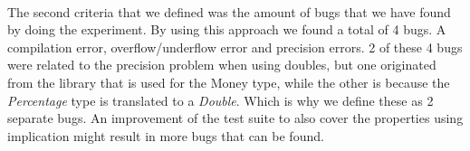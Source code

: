 \\
The second criteria that we defined was the amount of bugs that we have found by doing the experiment. By using this approach we found a total of 4 bugs. A compilation error, overflow/underflow error and precision errors. 2 of these 4 bugs were related to the precision problem when using doubles, but one originated from the library that is used for the Money type, while the other is because the \textit{Percentage} type is translated to a \textit{Double}. Which is why we define these as 2 separate bugs. An improvement of the test suite to also cover the properties using implication might result in more bugs that can be found. 













